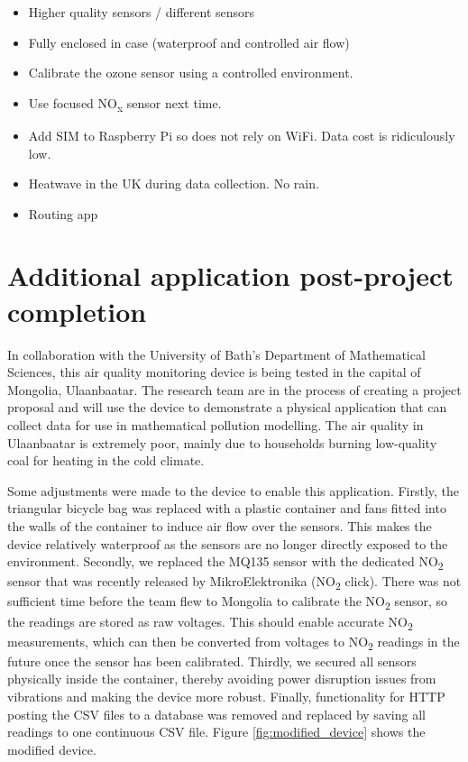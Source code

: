 \documentclass[11pt,twosided,a4paper]{report}
\begin{document}

\begin{itemize}
\item Higher quality sensors / different sensors
\item Fully enclosed in case (waterproof and controlled air flow)
\item Calibrate the ozone sensor using a controlled environment.
\item Use focused NO\textsubscript{x} sensor next time.
\item Add SIM to Raspberry Pi so does not rely on WiFi. Data cost is ridiculously low.
\item Heatwave in the UK during data collection. No rain.
\item Routing app
\end{itemize}

\section{Additional application post-project completion}

In collaboration with the University of Bath's Department of Mathematical Sciences, this air quality monitoring device is being tested in the capital of Mongolia, Ulaanbaatar. The research team are in the process of creating a project proposal and will use the device to demonstrate a physical application that can collect data for use in mathematical pollution modelling. The air quality in Ulaanbaatar is extremely poor, mainly due to households burning low-quality coal for heating in the cold climate.

Some adjustments were made to the device to enable this application. Firstly, the triangular bicycle bag was replaced with a plastic container and fans fitted into the walls of the container to induce air flow over the sensors. This makes the device relatively waterproof as the sensors are no longer directly exposed to the environment. Secondly, we replaced the MQ135 sensor with the dedicated NO\textsubscript{2} sensor that was recently released by MikroElektronika (NO\textsubscript{2} click). There was not sufficient time before the team flew to Mongolia to calibrate the NO\textsubscript{2} sensor, so the readings are stored as raw voltages. This should enable accurate NO\textsubscript{2} measurements, which can then be converted from voltages to NO\textsubscript{2} readings in the future once the sensor has been calibrated. Thirdly, we secured all sensors physically inside the container, thereby avoiding power disruption issues from vibrations and making the device more robust. Finally, functionality for HTTP posting the CSV files to a database was removed and replaced by saving all readings to one continuous CSV file. Figure \ref{fig:modified_device} shows the modified device.
\end{document}
